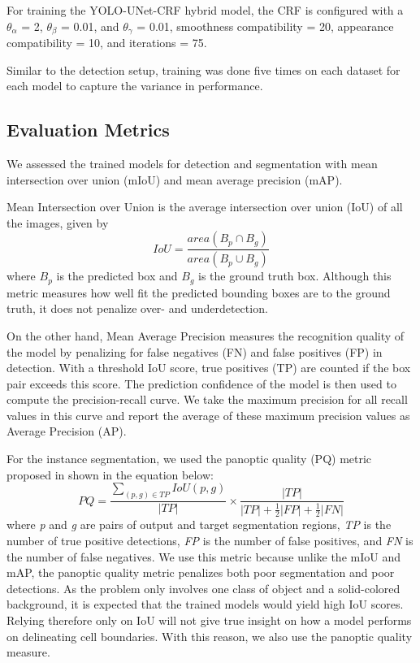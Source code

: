 \documentclass[10pt, journal, compsoc]{IEEEtran}
\begin{document}
For training the YOLO-UNet-CRF hybrid model, the CRF is configured with a $\theta_\alpha$ = 2, $\theta_\beta$ = 0.01, and $\theta_\gamma$ = 0.01, smoothness compatibility = 20, appearance compatibility = 10, and iterations = 75.

Similar to the detection setup, training was done five times on each dataset for each model to capture the variance in performance.
\subsection{Evaluation Metrics}
We assessed the trained models for detection and segmentation with mean intersection over union (mIoU) and mean average precision (mAP). 

Mean Intersection over Union is the average intersection over union (IoU) of all the images, given by
\begin{equation}
IoU = \frac{area(B_{p}\cap B_{g})}{area(B_{p}\cup B_{g})}
\end{equation}
where \textit{$B_p$} is the predicted box and \textit{$B_g$} is the ground truth box. Although this metric measures how well fit the predicted bounding boxes are to the ground truth, it does not penalize over- and underdetection.

On the other hand, Mean Average Precision measures the recognition quality of the model by penalizing for false negatives (FN) and false positives (FP) in detection. With a threshold IoU score, true positives (TP) are counted if the box pair exceeds this score. The prediction confidence of the model is then used to compute the precision-recall curve. We take the maximum precision for all recall values in this curve and report the average of these maximum precision values as Average Precision (AP). %

For the instance segmentation, we used the panoptic quality (PQ) metric proposed in \cite{DBLP:journals/corr/abs-1801-00868} shown in the equation below:
\begin{equation}
PQ = \frac{\sum_{(p,g)\in TP}IoU(p,g)}{|TP|} \times \frac{|TP|}{|TP| + \frac{1}{2}|FP| + \frac{1}{2}|FN|}
\end{equation}
where \textit{p} and \textit{g} are pairs of output and target segmentation regions, \textit{TP} is the number of true positive detections, \textit{FP} is the number of false positives, and \textit{FN} is the number of false negatives. We use this metric because unlike the mIoU and mAP, the panoptic quality metric penalizes both poor segmentation and poor detections. As the problem only involves one class of object and a solid-colored background, it is expected that the trained models would yield high IoU scores. Relying therefore only on IoU will not give true insight on how a model performs on delineating cell boundaries. With this reason, we also use the panoptic quality measure.
\end{document}
